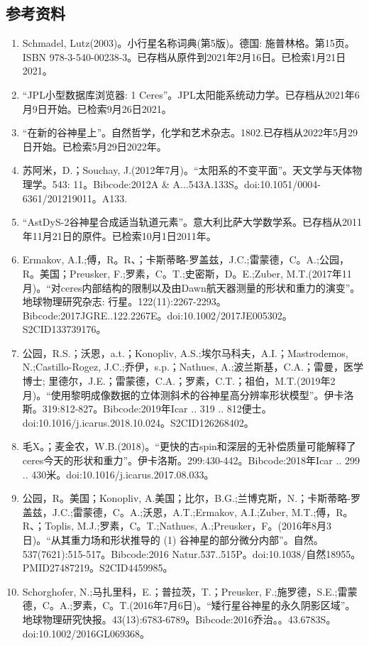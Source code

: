 \subsection{参考资料}
\begin{enumerate}
\item Schmadel, Lutz(2003)。小行星名称词典(第5版)。德国: 施普林格。第15页。ISBN 978-3-540-00238-3。已存档从原件到2021年2月16日。已检索1月21日2021。
\item “JPL小型数据库浏览器: 1 Ceres”。JPL太阳能系统动力学。已存档从2021年6月9日开始。已检索9月26日2021。
\item “在新的谷神星上”。自然哲学，化学和艺术杂志。1802.已存档从2022年5月29日开始。已检索5月29日2022年。
\item 苏阿米，D.；Souchay, J.(2012年7月)。“太阳系的不变平面”。天文学与天体物理学。543: 11。Bibcode:2012A & A...543A.133S。doi:10.1051/0004-6361/201219011。A133.
\item “AstDyS-2谷神星合成适当轨道元素”。意大利比萨大学数学系。已存档从2011年11月21日的原件。已检索10月1日2011年。
\item Ermakov, A.I.;傅，R。R、；卡斯蒂略-罗盖兹，J.C.;雷蒙德，C。A.;公园，R。美国；Preusker, F.;罗素，C。T.;史密斯，D。E.;Zuber, M.T.(2017年11月)。“对ceres内部结构的限制以及由Dawn航天器测量的形状和重力的演变”。地球物理研究杂志: 行星。122(11):2267-2293。Bibcode:2017JGRE..122.2267E。doi:10.1002/2017JE005302。S2CID133739176。 
\item 公园，R.S.；沃恩，a.t.；Konopliv, A.S.;埃尔马科夫，A.I.；Mastrodemos, N.;Castillo-Rogez, J.C.;乔伊，s.p.；Nathues, A.;波兰斯基，C.A.；雷曼，医学博士; 里德尔，J.E.；雷蒙德，C.A.；罗素，C.T.；祖伯，M.T.(2019年2月)。“使用黎明成像数据的立体测斜术的谷神星高分辨率形状模型”。伊卡洛斯。319:812-827。Bibcode:2019年Icar .. 319 .. 812便士。doi:10.1016/j.icarus.2018.10.024。S2CID126268402。 
\item 毛X。；麦金农，W.B.(2018)。“更快的古spin和深层的无补偿质量可能解释了ceres今天的形状和重力”。伊卡洛斯。299:430-442。Bibcode:2018年Icar .. 299 .. 430米。doi:10.1016/j.icarus.2017.08.033。
\item 公园，R。美国；Konopliv, A.美国；比尔，B.G.;兰博克斯，N.；卡斯蒂略-罗盖兹，J.C.;雷蒙德，C。A.;沃恩，A.T.;Ermakov, A.I.;Zuber, M.T.;傅，R。R、；Toplis, M.J.;罗素，C。T.;Nathues, A.;Preusker，F。(2016年8月3日)。“从其重力场和形状推导的 (1) 谷神星的部分微分内部”。自然。537(7621):515-517。Bibcode:2016 Natur.537..515P。doi:10.1038/自然18955。PMID27487219。S2CID4459985。  
\item Schorghofer, N.;马扎里科，E.；普拉茨，T.；Preusker, F.;施罗德，S.E.;雷蒙德，C。A.;罗素，C。T.(2016年7月6日)。“矮行星谷神星的永久阴影区域”。地球物理研究快报。43(13):6783-6789。Bibcode:2016乔治。。43.6783S。doi:10.1002/2016GL069368。

\end{enumerate}
